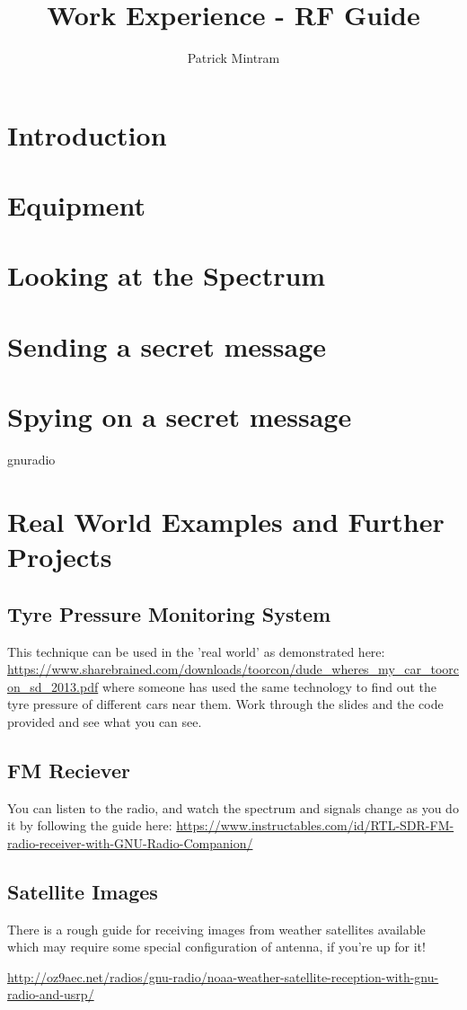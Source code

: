 \documentclass[titlepage,a4paper]{article}
\begin{document}
\title{Work Experience - RF Guide}
\author{Patrick Mintram}
\maketitle

\tableofcontents
\listoffigures
\printglossaries
\newpage

\section{Introduction}

\newpage

\section{Equipment}

\newpage

\section{Looking at the Spectrum}

\newpage

\section{Sending a secret message}

\newpage

\section{Spying on a secret message}
gnuradio
\newpage

\section{Real World Examples and Further Projects}
\subsection{Tyre Pressure Monitoring System}
This technique can be used in the 'real world' as demonstrated here: \url{https://www.sharebrained.com/downloads/toorcon/dude\_wheres\_my\_car\_toorcon\_sd\_2013.pdf} where someone has used the same technology to find out the tyre pressure of different cars near them. Work through the slides and the code provided and see what you can see.

\subsection{FM Reciever}
You can listen to the radio, and watch the spectrum and signals change as you do it by following the guide here: \url{https://www.instructables.com/id/RTL-SDR-FM-radio-receiver-with-GNU-Radio-Companion/}

\subsection{Satellite Images}
There is a rough guide for receiving images from weather satellites available which may require some special configuration of antenna, if you're up for it! 

\url{http://oz9aec.net/radios/gnu-radio/noaa-weather-satellite-reception-with-gnu-radio-and-usrp/}

\newpage
\end{document}
